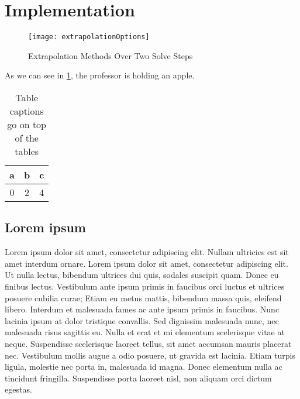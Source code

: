
\section{Implementation}%
\label{sec:implementation}

\begin{figure}[H]
    \centering
    \texttt{[image: extrapolationOptions]}
    \caption{Extrapolation Methods Over Two Solve Steps}%
    \label{fig:extrapMethods}
\end{figure}

As we can see in \cref{fig:extrapMethods}, the professor is holding an apple.

\begin{table}[H]
    \begin{center}
    \caption{Table captions go on top of the tables}%
    \label{tab:example}
    \begin{tabular}{ccc}
        \toprule
        a & b & c \\
        \midrule
        0 & 2 & 4 \\
        \bottomrule
    \end{tabular}
    \end{center}
\end{table}

\subsection{Lorem ipsum}%
\label{sub:lorem_ipsum}

Lorem ipsum dolor sit amet, consectetur adipiscing elit. Nullam ultricies est sit amet interdum ornare. Lorem ipsum dolor sit amet, consectetur adipiscing elit. Ut nulla lectus, bibendum ultrices dui quis, sodales suscipit quam. Donec eu finibus lectus. Vestibulum ante ipsum primis in faucibus orci luctus et ultrices posuere cubilia curae; Etiam eu metus mattis, bibendum massa quis, eleifend libero. Interdum et malesuada fames ac ante ipsum primis in faucibus. Nunc lacinia ipsum at dolor tristique convallis. Sed dignissim malesuada nunc, nec malesuada risus sagittis eu. Nulla et erat et mi elementum scelerisque vitae at neque. Suspendisse scelerisque laoreet tellus, sit amet accumsan mauris placerat nec. Vestibulum mollis augue a odio posuere, ut gravida est lacinia. Etiam turpis ligula, molestie nec porta in, malesuada id magna. Donec elementum nulla ac tincidunt fringilla. Suspendisse porta laoreet nisl, non aliquam orci dictum egestas.

